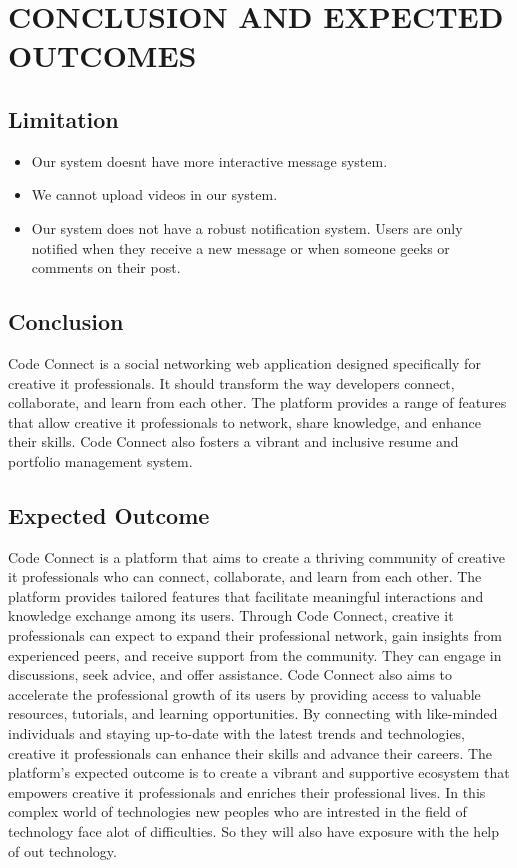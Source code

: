 \chapter{CONCLUSION AND EXPECTED OUTCOMES}
\section{Limitation}
\begin{itemize}
    \item Our system doesnt have more interactive message system.
    \item We cannot upload videos in our system.
    \item Our system does not have a robust notification system. Users are only notified when they receive a new message or when someone geeks or comments on their post.
\end{itemize}
\section{Conclusion}
Code Connect is a social networking web application designed specifically for creative it professionals. It should transform the way developers connect, collaborate, and learn from each other. The platform provides a range of features that allow creative it professionals to network, share knowledge, and enhance their skills. Code Connect also fosters a vibrant and inclusive resume and portfolio management system.
\section{Expected Outcome}
Code Connect is a platform that aims to create a thriving community of creative it professionals who can connect, collaborate, and learn from each other. The platform provides tailored features that facilitate meaningful interactions and knowledge exchange among its users. Through Code Connect, creative it professionals can expect to expand their professional network, gain insights from experienced peers, and receive support from the community. They can engage in discussions, seek advice, and offer assistance. Code Connect also aims to accelerate the professional growth of its users by providing access to valuable resources, tutorials, and learning opportunities. By connecting with like-minded individuals and staying up-to-date with the latest trends and technologies, creative it professionals can enhance their skills and advance their careers. The platform's expected outcome is to create a vibrant and supportive ecosystem that empowers creative it professionals and enriches their professional lives.
In this complex world of technologies new peoples who are intrested in the field of technology face alot of difficulties.
So they will also have exposure with the help of out technology.